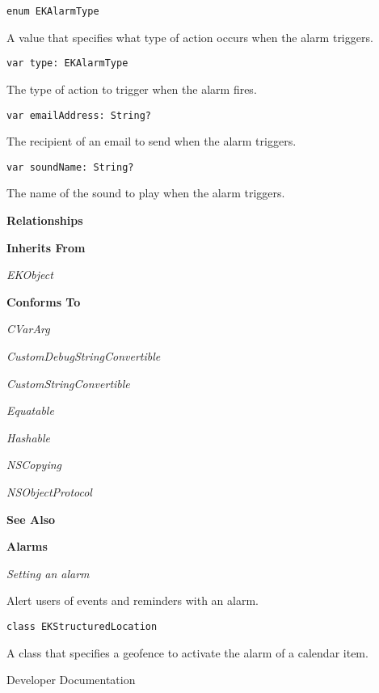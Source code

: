 \documentclass{article}
\begin{document}
\texttt{enum EKAlarmType}

A value that specifies what type of action occurs when the alarm triggers.

\texttt{var type: EKAlarmType}

The type of action to trigger when the alarm fires.

\texttt{var emailAddress: String?}

The recipient of an email to send when the alarm triggers.

\texttt{var soundName: String?}

The name of the sound to play when the alarm triggers.

\textbf{Relationships}

\textbf{Inherits From}

\textit{EKObject}

\textbf{Conforms To}

\textit{CVarArg}

\textit{CustomDebugStringConvertible}

\textit{CustomStringConvertible}

\textit{Equatable}

\textit{Hashable}

\textit{NSCopying}

\textit{NSObjectProtocol}

\textbf{See Also}

\textbf{Alarms}

\textit{Setting an alarm}

Alert users of events and reminders with an alarm.

\texttt{class EKStructuredLocation}

A class that specifies a geofence to activate the alarm of a calendar item.

Developer Documentation
\end{document}
